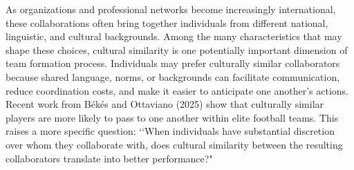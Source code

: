 \documentclass[10pt]{article}
\begin{document}
As organizations and professional networks become increasingly international, these collaborations often bring together individuals from different national, linguistic, and cultural backgrounds. Among the many characteristics that may shape these choices, cultural similarity is one potentially important dimension of team formation process. Individuals may prefer culturally similar collaborators because shared language, norms, or backgrounds can facilitate communication, reduce coordination costs, and make it easier to anticipate one another's actions. %
Recent work from Békés and Ottaviano (2025) show that culturally similar players are more likely to pass to one another within elite football teams. %
This raises a more specific question: \lq\lq When individuals have substantial discretion over whom they collaborate with, does cultural similarity between the resulting collaborators translate into better performance?" 
\end{document}
